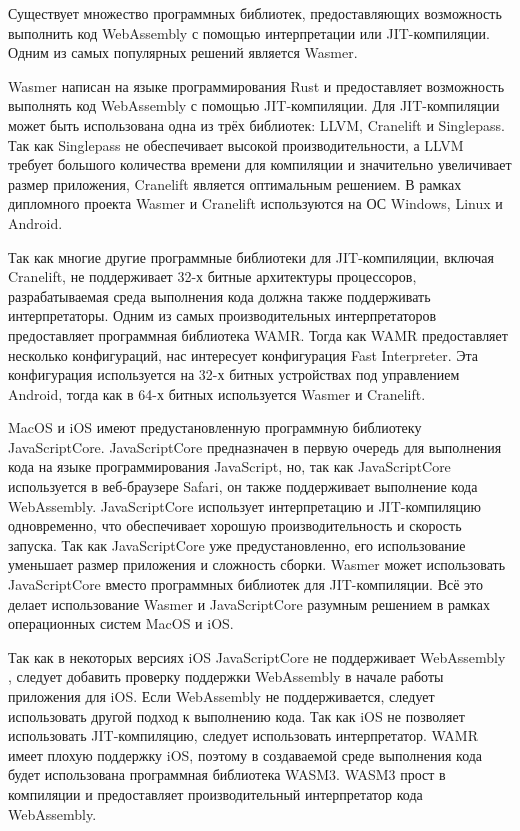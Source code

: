 Существует множество программных библиотек, предоставляющих возможность выполнить код WebAssembly с помощью интерпретации или JIT-компиляции.
Одним из самых популярных решений является Wasmer.

Wasmer написан на языке программирования Rust и предоставляет возможность выполнять код WebAssembly с помощью JIT-компиляции.
Для JIT-компиляции может быть использована одна из трёх библиотек: LLVM, Cranelift и Singlepass.
Так как Singlepass не обеспечивает высокой производительности, а LLVM требует большого количества времени для компиляции \cite{WasmerRuntimes} и значительно увеличивает размер приложения, Cranelift является оптимальным решением.
В рамках дипломного проекта Wasmer и Cranelift используются на ОС Windows, Linux и Android.

Так как многие другие программные библиотеки для JIT-компиляции, включая Cranelift, не поддерживает 32-х битные архитектуры процессоров, разрабатываемая среда выполнения кода должна также поддерживать интерпретаторы.
Одним из самых производительных интерпретаторов предоставляет программная библиотека WAMR.
Тогда как WAMR предоставляет несколько конфигураций, нас интересует конфигурация Fast Interpreter.
Эта конфигурация используется на 32-х битных устройствах под управлением Android, тогда как в 64-х битных используется Wasmer и Cranelift.

MacOS и iOS имеют предустановленную программную библиотеку JavaScriptCore.
JavaScriptCore предназначен в первую очередь для выполнения кода на языке программирования JavaScript, но, так как JavaScriptCore используется в веб-браузере Safari, он также поддерживает выполнение кода WebAssembly.
JavaScriptCore использует интерпретацию и JIT-компиляцию одновременно, что обеспечивает хорошую производительность и скорость запуска.
Так как JavaScriptCore уже предустановленно, его использование уменьшает размер приложения и сложность сборки.
Wasmer может использовать JavaScriptCore вместо программных библиотек для JIT-компиляции.
Всё это делает использование Wasmer и JavaScriptCore разумным решением в рамках операционных систем MacOS и iOS.

Так как в некоторых версиях iOS JavaScriptCore не поддерживает WebAssembly \cite{JSCNoWasm}, следует добавить проверку поддержки WebAssembly в начале работы приложения для iOS.
Если WebAssembly не поддерживается, следует использовать другой подход к выполнению кода.
Так как iOS не позволяет использовать JIT-компиляцию, следует использовать интерпретатор.
WAMR имеет плохую поддержку iOS, поэтому в создаваемой среде выполнения кода будет использована программная библиотека WASM3.
WASM3 прост в компиляции и предоставляет производительный интерпретатор кода WebAssembly.
